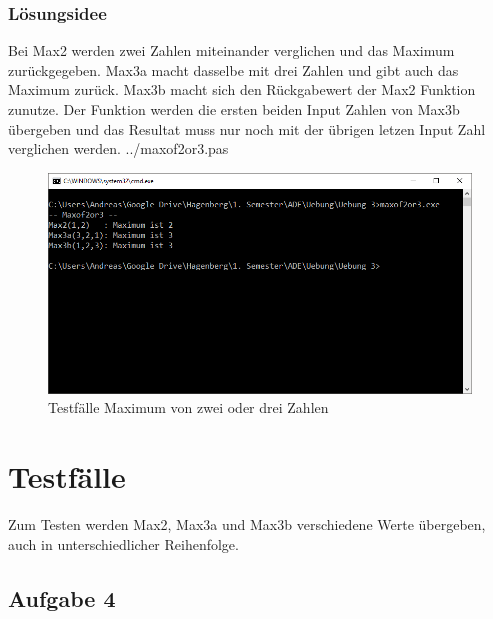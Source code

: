 \subsubsection*{Lösungsidee}
Bei Max2 werden zwei Zahlen miteinander verglichen und das Maximum zurückgegeben. Max3a macht dasselbe mit drei Zahlen und gibt auch das Maximum zurück. Max3b macht sich den Rückgabewert der Max2 Funktion zunutze. Der Funktion werden die ersten beiden Input Zahlen von Max3b übergeben und das Resultat muss nur noch mit der übrigen letzen Input Zahl verglichen werden.
\newline
 {../maxof2or3.pas}
\begin{figure}[H]
	\centering
	\includegraphics[scale=0.75]{./pictures/maxof2or3.png}
	\caption{Testfälle Maximum von zwei oder drei Zahlen}
	\label{fig: label}
\end{figure}

\section*{Testfälle}
Zum Testen werden Max2, Max3a und Max3b verschiedene Werte übergeben, auch in unterschiedlicher Reihenfolge.
\newpage

\subsection*{Aufgabe 4}
